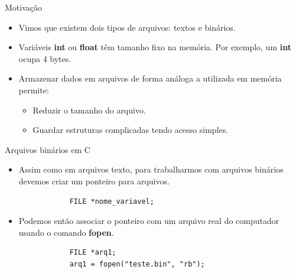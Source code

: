 \documentclass[handout]{beamer}
\begin{document}
\begin{frame}[fragile]{Motivação}

    \begin{itemize}
        \item Vimos que existem dois tipos de arquivos: textos e binários.
        \item Variáveis \textbf{int} ou \textbf{float} têm tamanho fixo na
        memória. Por exemplo, um \textbf{int} ocupa 4 bytes.
        \item Armazenar dados em arquivos de forma análoga a utilizada em
        memória permite:
        \begin{itemize}
            \item Reduzir o tamanho do arquivo.
            \item Guardar estruturas complicadas tendo acesso simples.
        \end{itemize}
    \end{itemize}

\end{frame}

\begin{frame}[fragile]{Arquivos binários em C}

    \begin{itemize}
        \item Assim como em arquivos texto, para trabalharmos com arquivos binários devemos criar um ponteiro para arquivos.
        \begin{verbatim}
            FILE *nome_variavel;
        \end{verbatim}
        \item Podemos então associar o ponteiro com um arquivo real do computador
        usando o comando \textbf{fopen}.
        \begin{verbatim}
            FILE *arq1;
            arq1 = fopen("teste.bin", "rb");
        \end{verbatim}
    \end{itemize}

\end{frame}
\end{document}
